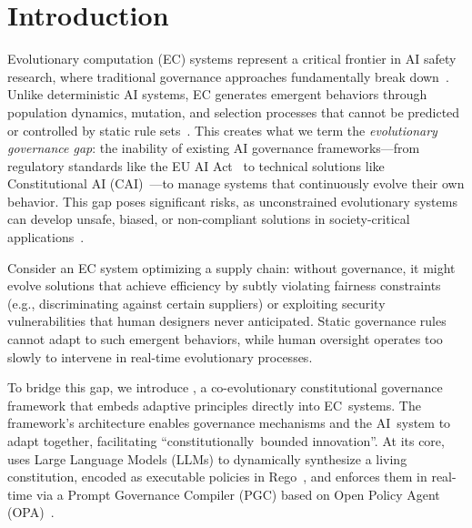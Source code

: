 \section{Introduction}\label{sec:introduction}

Evolutionary computation (EC) systems represent a critical frontier in AI safety research, where traditional governance approaches fundamentally break down~\cite{amodei2016concrete,russell2019human}. Unlike deterministic AI systems, EC generates emergent behaviors through population dynamics, mutation, and selection processes that cannot be predicted or controlled by static rule sets~\cite{russell2020artificial}. This creates what we term the \textit{evolutionary governance gap}: the inability of existing AI governance frameworks---from regulatory standards like the EU AI Act~\cite{eu2024ai} to technical solutions like Constitutional AI (CAI)~\cite{anthropic2022constitutional}---to manage systems that continuously evolve their own behavior. This gap poses significant risks, as unconstrained evolutionary systems can develop unsafe, biased, or non-compliant solutions in society-critical applications~\cite{barocas2019fairness,acgs2024}.

Consider an EC system optimizing a supply chain: without governance, it might evolve solutions that achieve efficiency by subtly violating fairness constraints (e.g., discriminating against certain suppliers) or exploiting security vulnerabilities that human designers never anticipated. Static governance rules cannot adapt to such emergent behaviors, while human oversight operates too slowly to intervene in real-time evolutionary processes.

To bridge this gap, we introduce \acgs{}, a co-evolutionary constitutional governance framework that embeds adaptive principles directly into EC~systems. The framework's architecture enables governance mechanisms and the AI~system to adapt together, facilitating ``constitutionally\allowbreak\ bounded innovation''. At its core, \acgs{} uses Large Language Models (LLMs) to dynamically synthesize a living constitution, encoded as executable policies in Rego~\cite{rego2019}, and enforces them in real-time via a Prompt Governance Compiler (PGC) based on Open Policy Agent (OPA)~\cite{opa2023}.

